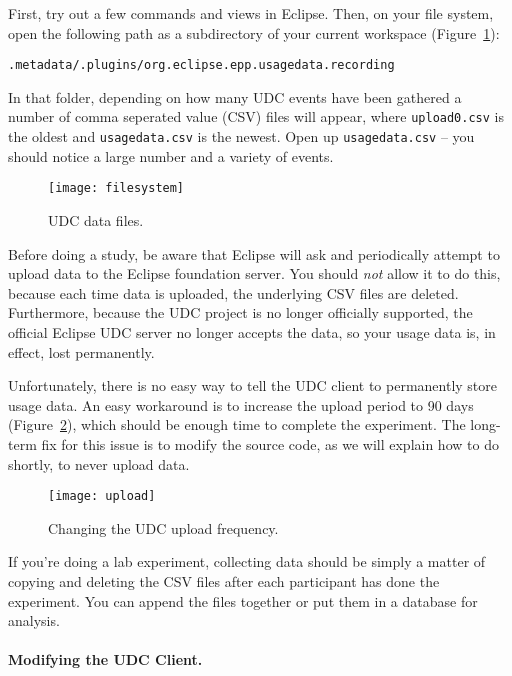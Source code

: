 First, try out a few commands and views in Eclipse.
Then, on your file system, open the following path as a subdirectory
of your current workspace (Figure~\ref{fig:filesystem}): 

\noindent
\texttt{.metadata/.plugins/org.eclipse.epp.usagedata.recording}

In that folder, depending on how many UDC events have been gathered
a number of comma seperated value (CSV) files will appear, where \texttt{upload0.csv} is the oldest
and \texttt{usagedata.csv} is the newest.
Open up \texttt{usagedata.csv} -- you should notice a large number and a variety of events.

\begin{figure}
  \centering
  \texttt{[image: filesystem]}
  \caption{UDC data files.}\label{fig:filesystem}
\end{figure}

Before doing a study, be aware that Eclipse will ask and periodically attempt to upload
data to the Eclipse foundation server.
You should \emph{not} allow it to do this, because each time data is uploaded, the underlying
CSV files are deleted.
Furthermore, because the UDC project is no longer officially supported, the official Eclipse
UDC server no longer accepts the data, so your usage data is, in effect, lost permanently.

Unfortunately, there is no easy way to tell the UDC client to permanently store
usage data.
An easy workaround is to increase the upload period to 90 days (Figure~\ref{fig:upload}),
which should be enough time to complete the experiment.
The long-term fix for this issue is to modify the source code, as we will explain
how to do shortly, to never upload data.

\begin{figure}
  \centering
  \texttt{[image: upload]}
  \caption{Changing the UDC upload frequency.}\label{fig:upload}
\end{figure}

If you're doing a lab experiment, collecting data should be simply a matter of
copying and deleting the CSV files after each participant has done the experiment.
You can append the files together or put them in a database for analysis.

\paragraph{Modifying the UDC Client.}

